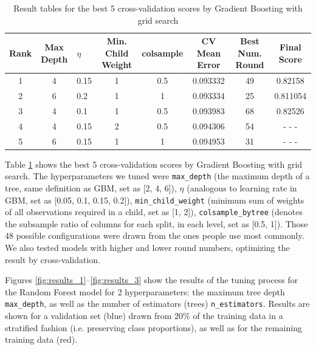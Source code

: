 \documentclass[11pt]{article}
\begin{document}
\begin{table}[htbp]
\centering
\begin{tabular}{cclccccc}
 \toprule
 Rank & \multicolumn{1}{p{1cm}}{\centering Max Depth} & \multicolumn{1}{p{0.8cm}}{\centering $\eta$} & 
 \multicolumn{1}{p{2cm}}{\centering Min. Child Weight} & colsample & \multicolumn{1}{p{2cm}}{\centering CV Mean Error} & 
\multicolumn{1}{p{2cm}}{\centering Best Num. Round} & Final Score\\
 \midrule
  1 & 4 & 0.15 & 1 & 0.5 & 0.093332 & 49 & 0.82158\\
  2 & 6 & 0.2 & 1 & 1 & 0.093334 & 25 & 0.811054\\
  3 & 4 & 0.1 & 1 & 0.5 & 0.093983 & 68 & 0.82526\\
  4 & 4 & 0.15 & 2 & 0.5 & 0.094306 & 54 & - - -\\
  5 & 6 & 0.15 & 1 & 1 & 0.094953 & 31 & - - -\\
 \bottomrule
\end{tabular}
\caption{\label{tab:results} Result tables for the best 5 cross-validation scores by Gradient Boosting with grid search}
\end{table}

Table \ref{tab:results}  shows the best 5 cross-validation scores by Gradient Boosting with grid search. The hyperparameters we tuned were \verb|max_depth| (the maximum depth of a tree, same definition as GBM, set as [2, 4, 6]), $\eta$ (analogous to learning rate in GBM, set as [0.05, 0.1, 0.15, 0.2]),  \verb|min_child_weight| (minimum sum of weights of all observations required in a child, set as [1, 2]), \verb|colsample_bytree| (denotes the subsample ratio of columns for each split, in each level, set as [0.5, 1]). Those 48 possible configurations were drawn from the ones people use most commonly. We also tested models with higher and lower round numbers, optimizing the result by cross-validation.

Figures \ref{fig:results_1}--\ref{fig:results_3} show the results of the tuning process for the Random Forest model for 2 hyperparameters: the maximum tree depth \verb|max_depth|, as well as the number of estimators (trees) \verb|n_estimators|. Results are shown for a validation set (blue) drawn from 20\% of the training data in a stratified fashion (i.e. preserving class proportions), as well as for the remaining training data (red). 
\end{document}
